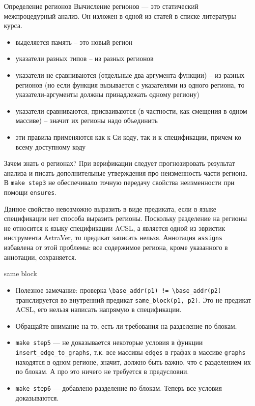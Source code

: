 \documentclass[hyperref={unicode=true}]{beamer}
\begin{document}
    \begin{frame}{Определение регионов}
    Вычисление регионов --- это статический межпроцедурный анализ. Он изложен в одной из статей в списке литературы курса.

    \begin{itemize}
    \item выделяется память -- это новый регион
    \item указатели разных типов -- из разных регионов
    \item указатели не сравниваются (отдельные два аргумента функции) -- из разных регионов (но если функция вызывается с указателями из одного региона, то
            указатели-аргументы должны принадлежать одному региону)
    \item указатели сравниваются, присваиваются (в частности, как смещения в одном массиве) -- значит их регионы надо объединить
    \item эти правила применяются как к Си коду, так и к спецификации, причем ко всему доступному коду
    \end{itemize}
    \end{frame}

    \begin{frame}{Зачем знать о регионах?}
    При верификации следует прогнозировать результат анализа и писать дополнительные
    утверждения про неизменность части региона. В \texttt{make step3} не обеспечивало точную передачу свойства неизменности при помощи \texttt{ensures}.

    Данное свойство невозможно выразить в виде предиката, если в языке спецификации нет способа выразить регионы. Поскольку разделение на регионы не относится
    к языку спецификации ACSL, а является одной из эвристик инструмента AstraVer, то предикат записать нельзя. Аннотация \texttt{assigns} избавлена от этой
    проблемы: все содержимое региона, кроме указанного в аннотации, сохраняется.
    \end{frame}

    \begin{frame}{same block}
    \begin{itemize}
    \item Полезное замечание: проверка \texttt{\textbackslash base\_addr(p1) != \textbackslash base\_addr(p2)} транслируется во внутренний предикат
    \texttt{same\_block(p1, p2)}. Это не предикат ACSL, его нельзя написать напрямую в спецификации.
    \item Обращайте внимание на то, есть ли требования на разделение по блокам.
    \item \texttt{make step5} --- не доказывается некоторые условия в функции \texttt{insert\_edge\_to\_graphs}, т.к. все массивы \texttt{edges} в графах в
    массиве \texttt{graphs} находятся в одном регионе, значит, должно быть важно, что с разделением их по блокам. А про это ничего не требуется в предусловии.
    \item \texttt{make step6} --- добавлено разделение по блокам. Теперь все условия доказываются.
    \end{itemize}
    \end{frame}
\end{document}
